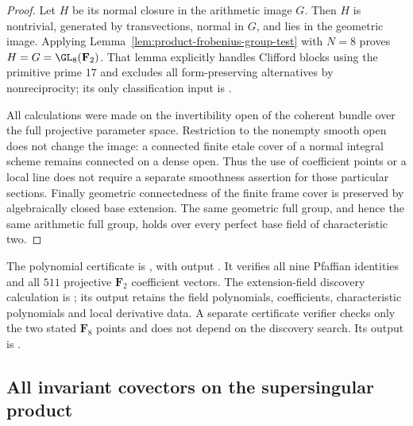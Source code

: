 \begin{proof}
Let $H$ be its normal closure in the arithmetic image $G$.
Then $H$ is nontrivial, generated by transvections, normal in $G$,
and lies in the geometric image. Applying
Lemma~\ref{lem:product-frobenius-group-test} with $N=8$ proves
$H=G=\GL_8(\mathbf F_2)$. That lemma explicitly handles Clifford
blocks using the primitive prime $17$ and excludes all form-preserving
alternatives by nonreciprocity; its only classification input is
\cite[Theorem~3.6, printed p.~22]{KantorSeress2001}.

All calculations were made on the invertibility open of the coherent
bundle over the full projective parameter space. Restriction to the
nonempty smooth open does not change the image: a connected finite
etale cover of a normal integral scheme remains connected on a
dense open. Thus the use of coefficient points or a local line does
not require a separate smoothness assertion for those particular
sections. Finally geometric connectedness of the finite frame cover
is preserved by algebraically closed base extension. The same
geometric full group, and hence the same arithmetic full group, holds
over every perfect base field of characteristic two.
\end{proof}

\begin{remark}\label{auto:A_monodromy:3502a4b6e144}

The polynomial certificate is
, with
output .
It verifies all nine Pfaffian identities and all $511$ projective
$\mathbf F_2$ coefficient vectors. The extension-field discovery
calculation is
;
its output retains the field polynomials, coefficients, characteristic
polynomials and local derivative data. A separate certificate verifier
checks only the two stated $\mathbf F_8$ points and does not depend
on the discovery search. Its output is
.
\end{remark}


\subsection{All invariant covectors on the supersingular product}
\label{subsec:ss-exact-covectors}

